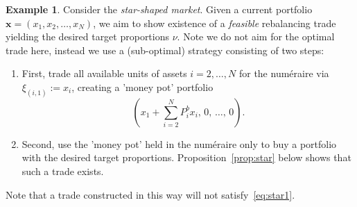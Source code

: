 \documentclass{article}
\theoremstyle{definition}
\newtheorem{example}[theorem]{Example}
\def\bx{\mathbf{x}}
\begin{document}
\begin{example}\label{ex:star4}
Consider the \emph{star-shaped market}. Given a current portfolio $\bx = (x_1, x_2, \dots, x_N)$, we aim to show existence of a \emph{feasible} rebalancing trade yielding the desired target proportions $\nu$. Note  we do not aim for the optimal trade here, instead we use a (sub-optimal) strategy consisting of two steps:
\begin{enumerate}
    \item First, trade all available units of assets $i=2, \dots, N$ for the num\'eraire via $\xi_{(i,1)} := x_i$, creating a 'money pot' portfolio
    \[
    \left(x_1 + \sum_{i=2}^N P^b_i x_i, \, 0, \,  \dots, \, 0 \right).
    \]
    \item Second, use the 'money pot' held in the num\'eraire only to buy a portfolio with the desired target proportions. Proposition~\ref{prop:star} below shows that such a trade exists.
\end{enumerate}
Note that a trade constructed in this way will not satisfy~\eqref{eq:star1}. 
\end{example}
\end{document}
